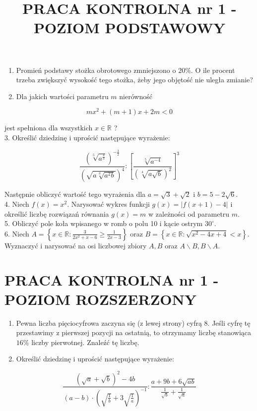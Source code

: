 \documentclass[10pt]{article}
\title{PRACA KONTROLNA nr 1 - POZIOM PODSTAWOWY }
\author{}
\date{}
\begin{document}
\maketitle
\begin{enumerate}
  \item Promień podstawy stożka obrotowego zmniejszono o $20 \%$. O ile procent trzeba zwiększyć wysokość tego stożka, żeby jego objętość nie uległa zmianie?
  \item Dla jakich wartości parametru $m$ nierówność
\end{enumerate}

$$
m x^{2}+(m+1) x+2 m<0
$$

jest spełniona dla wszystkich $x \in \mathbb{R}$ ?\\
3. Określić dziedzinę i uprościć następujące wyrażenie:

$$
\frac{\left(\sqrt[5]{a^{\frac{4}{3}}}\right)^{-\frac{3}{2}}}{\left(\sqrt{a \sqrt[3]{a^{2} b}}\right)^{4}}:\left[\frac{\sqrt[5]{a^{-4}}}{(\sqrt[4]{a \sqrt{b}})^{2}}\right]^{3}
$$

Następnie obliczyć wartość tego wyrażenia dla $a=\sqrt{3}+\sqrt{2}$ i $b=5-2 \sqrt{6}$.\\
4. Niech $f(x)=x^{2}$. Narysować wykres funkcji $g(x)=|f(x+1)-4|$ i określić liczbę rozwiązań równania $g(x)=m$ w zależności od parametru $m$.\\
5. Obliczyć pole koła wpisanego w romb o polu 10 i kącie ostrym $30^{\circ}$.\\
6. Niech $A=\left\{x \in \mathbb{R}: \frac{3}{2 x^{2}+x-6} \geqslant \frac{1}{2 x-3}\right\}$ oraz $B=\left\{x \in \mathbb{R}: \sqrt{x^{2}-4 x+4}<x\right\}$. Wyznaczyć i narysować na osi liczbowej zbiory $A, B$ oraz $A \backslash B, B \backslash A$.

\section*{PRACA KONTROLNA nr 1 - POZIOM ROZSZERZONY}
\begin{enumerate}
  \item Pewna liczba pięciocyfrowa zaczyna się (z lewej strony) cyfrą 8. Jeśli cyfrę tę przestawimy z pierwszej pozycji na ostatnią, to otrzymamy liczbę stanowiąca $16 \%$ liczby pierwotnej. Znaleźć tę liczbę.
  \item Określić dziedzinę i uprościć następujące wyrażenie:
\end{enumerate}

$$
\frac{(\sqrt{a}+\sqrt{b})^{2}-4 b}{(a-b) \cdot\left(\sqrt{\frac{1}{b}}+3 \sqrt{\frac{1}{a}}\right)^{-1}}: \frac{a+9 b+6 \sqrt{a b}}{\frac{1}{\sqrt{b}}+\frac{1}{\sqrt{a}}}
$$
\end{document}
